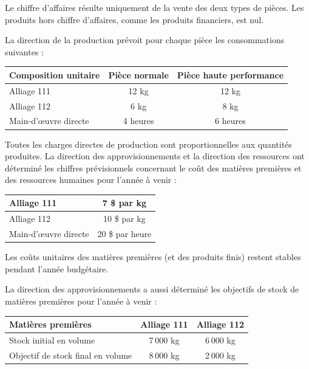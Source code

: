 \documentclass[oneside]{kaobook}
\begin{document}
Le chiffre d’affaires résulte uniquement de la vente des deux types de pièces. Les produits hors chiffre d’affaires, comme les produits financiers, est nul.

La direction de la production prévoit pour chaque pièce les consommations suivantes :

\begin{center}
\sidenotesize
\begin{tabular}{l c c}
Composition unitaire & Pièce normale & Pièce haute performance\\
\hline
Alliage 111 & 12 kg & 12 kg\\
Alliage 112 & 6 kg & 8 kg\\
Main-d'œuvre directe & 4 heures & 6 heures\\
\end{tabular}
\end{center}

Toutes les charges directes de production sont proportionnelles aux quantités produites. La direction des approvisionnements et la direction des ressources ont déterminé les chiffres prévisionnels concernant le coût des matières premières et des ressources humaines pour l'année à venir :

\begin{center}
\sidenotesize
\begin{tabular}{l c}
Alliage 111 & 7 \$ par kg\\
\hline
Alliage 112 & 10 \$ par kg\\
Main-d’œuvre directe & 20 \$ par heure\\
\end{tabular}
\end{center}
Les coûts unitaires des matières premières (et des produits finis) restent stables pendant l’année budgétaire.

La direction des approvisionnements a aussi déterminé les objectifs de stock de matières premières pour l'année à venir :

\begin{center}
\sidenotesize
\begin{tabular}{l c c}
Matières premières & Alliage 111 & Alliage 112\\
\hline
Stock initial en volume & 7 000 kg & 6 000 kg\\
Objectif de stock final en volume & 8 000 kg & 2 000 kg\\
\end{tabular}
\end{center}
\end{document}

